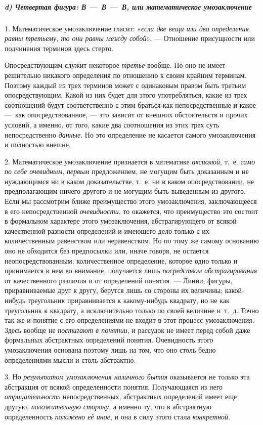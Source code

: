 \documentclass[twoside]{article}
\begin{document}
{{{{{\subparagraph[d) Четвертая фигура: В~—~В~—~В, или математическое умозаключение]
{d) Четвертая фигура: {\em В —~В —~В}, или математическое умозаключение}
\label{bkm:bm110a}
1. Математическое умозаключение гласит:
«{\em если две вещи или два определения
равны третьему, то они равны между собой}». — Отношение
присущности или подчинения терминов здесь стерто.

Опосредствующим служит некоторое
{\em третье} вообще. Но
оно не имеет решительно никакого определения по отношению к своим крайним
терминам. Поэтому каждый из трех терминов может с одинаковым правом быть
третьим опосредствующим. Какой из них будет для этого употребляться, какие
из трех соотношений будут соответственно с этим браться как
непосредственные и какое —~как опосредствованное, —
это зависит от внешних обстоятельств и прочих условий, а
именно, от того, какие два соотношения из этих трех суть непосредственно
{\em данные}. Но это
определение не касается самого умозаключения и полностью внешне.

2. Математическое умозаключение признается в математике
{\em аксиомой}, т.~е.
{\em само по себе очевидным},
{\em первым} предложением,
не могущим быть доказанным и не нуждающимся ни в каком доказательстве,
т.~е. ни в каком опосредствовании, не предполагающим ничего другого и не
могущим быть выведенным из другого. — Если мы рассмотрим
ближе преимущество этого умозаключения, заключающееся в его
непосредственной {\em очевидности},
то окажется, что преимущество это состоит в формальном
характере этого умозаключения, абстрагирующего от всякой качественной
разности определений и имеющего дело только с их количественным равенством
или неравенством. Но по тому же самому основанию оно не обходится без
предпосылки или, иначе говоря, не остается неопосредствованным;
количественное определение, которое одно только и принимается в нем во
внимание, получается лишь
{\em посредством абстрагирования}
от качественного различия и от определений понятия. —
Линии, фигуры, приравниваемые друг к другу, берутся лишь со
стороны их величины; какой-нибудь треугольник приравнивается к
какому-нибудь квадрату, но не как треугольник к квадрату, а исключительно
только по своей величине и~т.~д. Точно так же и понятие с его определениями
не входит в этот процесс умозаключения. Здесь вообще не
{\em постигают в понятии},
и рассудок не имеет перед собой даже формальных абстрактных
определений понятия. Очевидность этого умозаключения основана поэтому лишь
на том, что оно столь бедно определениями мысли и столь абстрактно.

3. Но {\em результатом
умозаключения наличного бытия} оказывается не только эта
абстракция от всякой определенности понятия. Получающаяся из него
{\em отрицательность}
непосредственных, абстрактных определений имеет еще другую,
{\em положительную сторону},
а именно ту, что в абстрактную определенность
{\em положено её иное},
и она в силу этого стала
{\em конкретной}.

}}}}}
\end{document}
